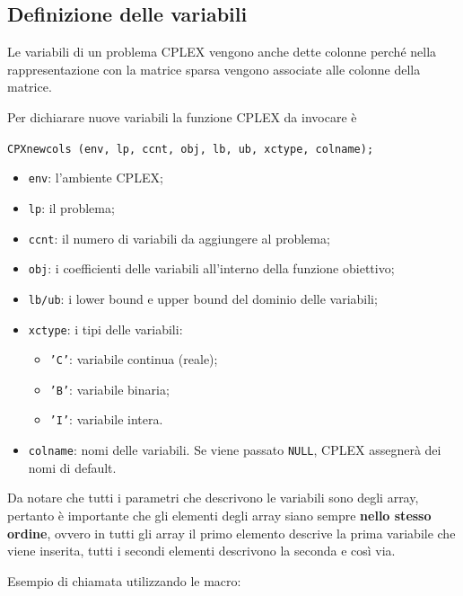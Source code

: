 \subsection{Definizione delle variabili}

Le variabili di un problema CPLEX vengono anche dette colonne perché nella rappresentazione con la matrice sparsa vengono associate alle colonne della matrice.

Per dichiarare nuove variabili la funzione CPLEX da invocare è

\begin{center}
\texttt{CPXnewcols (env, lp, ccnt, obj, lb, ub, xctype, colname);}
\end{center}

\begin{itemize}
	\item \texttt{env}: l'ambiente CPLEX;
	\item \texttt{lp}: il problema;
	\item \texttt{ccnt}: il numero di variabili da aggiungere al problema;
	\item \texttt{obj}: i coefficienti delle variabili all'interno della funzione obiettivo;
	\item \texttt{lb/ub}: i lower bound e upper bound del dominio delle variabili;
	\item \texttt{xctype}: i tipi delle variabili:
	\begin{itemize}
		\item \texttt{'C'}: variabile continua (reale);
		\item \texttt{'B'}: variabile binaria;
		\item \texttt{'I'}: variabile intera.
	\end{itemize}
	\item \texttt{colname}: nomi delle variabili. Se viene passato \texttt{NULL}, CPLEX assegnerà dei nomi di default.
\end{itemize}

\noindent Da notare che tutti i parametri che descrivono le variabili sono degli array, pertanto è importante che gli elementi degli array siano sempre \textbf{nello stesso ordine}, ovvero in tutti gli array il primo elemento descrive la prima variabile che viene inserita, tutti i secondi elementi descrivono la seconda e così via.

Esempio di chiamata utilizzando le macro:

